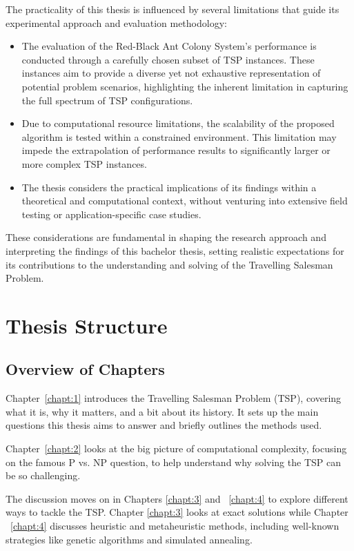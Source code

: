 The practicality of this thesis is influenced by several limitations that guide its experimental approach and evaluation methodology:

\begin{itemize}
	\item The evaluation of the Red-Black Ant Colony System's performance is conducted through a carefully chosen subset of TSP instances. These instances aim to provide a diverse yet not exhaustive representation of potential problem scenarios, highlighting the inherent limitation in capturing the full spectrum of TSP configurations.
	\item Due to computational resource limitations, the scalability of the proposed algorithm is tested within a constrained environment. This limitation may impede the extrapolation of performance results to significantly larger or more complex TSP instances.
	\item The thesis considers the practical implications of its findings within a theoretical and computational context, without venturing into extensive field testing or application-specific case studies.
\end{itemize}

These considerations are fundamental in shaping the research approach and interpreting the findings of this bachelor thesis, setting realistic expectations for its contributions to the understanding and solving of the Travelling Salesman Problem.

\section{Thesis Structure}

\subsection{Overview of Chapters}

Chapter~\ref{chapt:1} introduces the Travelling Salesman Problem (TSP), covering what it is, why it matters, and a bit about its history. It sets up the main questions this thesis aims to answer and briefly outlines the methods used.

Chapter~\ref{chapt:2} looks at the big picture of computational complexity, focusing on the famous P vs. NP question, to help understand why solving the TSP can be so challenging.

The discussion moves on in Chapters \ref{chapt:3} and ~\ref{chapt:4} to explore different ways to tackle the TSP. Chapter \ref{chapt:3} looks at exact solutions while Chapter ~\ref{chapt:4} discusses heuristic and metaheuristic methods, including well-known strategies like genetic algorithms and simulated annealing.

